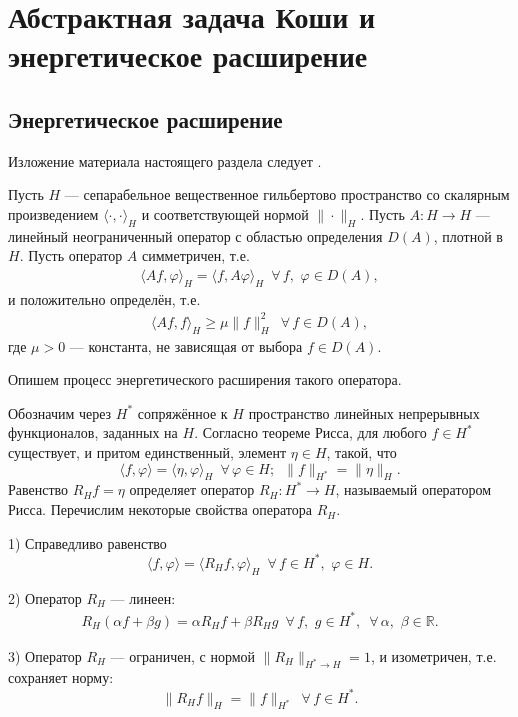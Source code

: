 \documentclass{report}
\begin{document}
    \chapter{Абстрактная задача Коши и энергетическое расширение}
        \section{Энергетическое расширение}\label{energetic_extension}
Изложение материала настоящего раздела следует \cite[Глава IV, \S2]{osipov.vasilev.potapov}.

Пусть $H$ --- сепарабельное вещественное гильбертово пространство со скалярным произведением $\langle\cdot,\cdot\rangle_H$ и соответствующей нормой $\|\cdot\|_H$. Пусть $A:H\to H$ ---
линейный неограниченный оператор с областью определения $D(A)$, плотной в $H$. Пусть оператор $A$ симметричен, т.е.
\begin{gather}\label{energetic_extension!simmetricity}
\langle Af,\varphi\rangle_H=\langle f,A\varphi\rangle_H\,\,\,\forall\,f,\,\,\varphi\in D(A),
\end{gather}
и положительно определён, т.е.
\begin{gather}\label{energetic_extension!positive}
\langle Af,f\rangle_H\geqslant\mu\|f\|^2_H\,\,\,\forall\,f\in D(A),
\end{gather}
где $\mu>0$ --- константа, не зависящая от выбора $f\in D(A)$.

Опишем процесс энергетического расширения такого оператора.

Обозначим через $H^*$ сопряжённое к $H$ пространство линейных непрерывных функционалов, заданных на $H$. Согласно теореме Рисса, для любого $f\in H^*$ существует, и притом единственный,
элемент $\eta\in H$, такой, что
$$
\langle f,\varphi\rangle=\langle\eta,\varphi\rangle_H\,\,\,\forall\,\varphi\in H;\,\,\,\|f\|_{H^*}=\|\eta\|_H.
$$
Равенство $R_Hf=\eta$ определяет оператор $R_H:H^*\to H$, называемый оператором Рисса. Перечислим некоторые свойства оператора $R_H$.

1) Справедливо равенство
$$
\langle f,\varphi\rangle=\langle R_Hf,\varphi\rangle_H\,\,\,\forall\,f\in H^*,\,\,\varphi\in H.
$$

2) Оператор $R_H$ --- линеен:
\begin{gather*}
R_H(\alpha f+\beta g)=\alpha R_Hf+\beta R_Hg\,\,\,\forall\,f,\,\,g\in H^*,\,\,\,\forall\,\alpha,\,\,\beta\in\mathbb{R}.
\end{gather*}

3) Оператор $R_H$ --- ограничен, с нормой $\|R_H\|_{H^*\to H}=1$, и изометричен, т.е. сохраняет норму:
$$
\|R_Hf\|_H=\|f\|_{H^*}\,\,\,\forall\,f\in H^*.
$$
\end{document}
